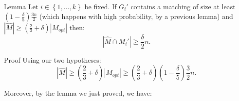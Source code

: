 \documentclass[a4paper]{article}
\begin{document}
\begin{parag}{Lemma}
    Let $i \in \left\{1, \ldots, k\right\}$ be fixed. If $G_i'$ contains a matching of size at least $\left(1 - \frac{\delta}{5}\right)\frac{3n}{2}$ (which happens with high probability, by a previous lemma) and $\left|\hat{M}\right| \geq \left(\frac{2}{3}+ \delta\right)\left|M_{opt}\right|$ then: 
    \[\left|\hat{M} \cap M_i'\right| \geq \frac{\delta}{2}n.\]

    \begin{subparag}{Proof}
        Using our two hypotheses:
        \[\left|\hat{M}\right| \geq \left(\frac{2}{3} + \delta\right) \left|M_{opt}\right| \geq \left(\frac{2}{3} + \delta\right)\left(1 - \frac{\delta}{5}\right) \frac{3}{2}n.\]

        Moreover, by the lemma we just proved, we have: 
    \end{subparag}
\end{parag}
\end{document}
